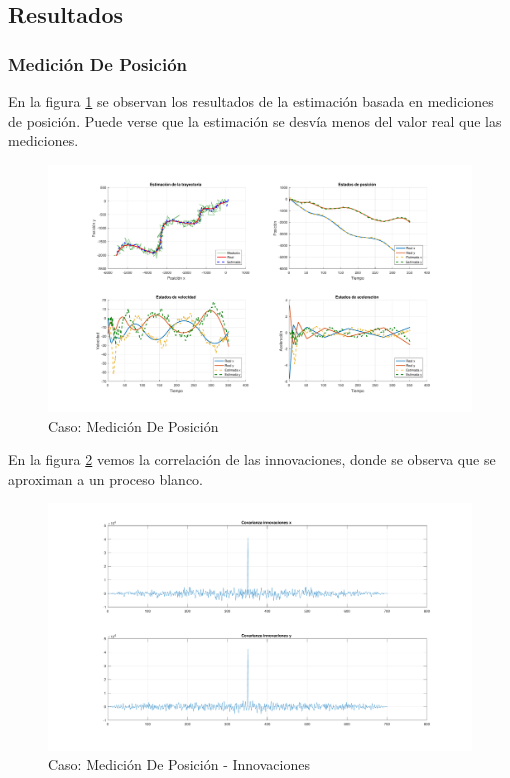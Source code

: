 	\subsection{Resultados}
		\subsubsection{Medición De Posición}
			En la figura \ref{fig:ej2a} se observan los resultados de la estimación basada en mediciones de posición. Puede verse que la estimación se desvía menos del valor real que las mediciones.

		\begin{figure}[H]
			\centering
			\includegraphics[scale=0.5,trim={6,5cm 0 0 0}]{Figuras/graf_ej2a.pdf}
			\caption{Caso: Medición De Posición}
			\label{fig:ej2a}
		\end{figure}
		
		En la figura \ref{fig:ej2a_innov} vemos la correlación de las innovaciones, donde se observa que se aproximan a un proceso blanco.
		
		\begin{figure}[H]
			\centering
			\includegraphics[width=1.0\textwidth,keepaspectratio]{Figuras/covinn_ej2a.pdf}
			\caption{Caso: Medición De Posición - Innovaciones}
			\label{fig:ej2a_innov}
		\end{figure}
		
